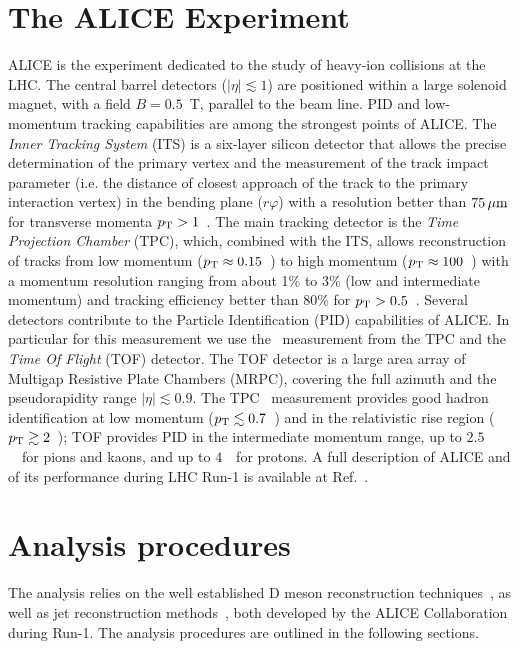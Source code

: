 \documentclass[a4paper]{jpconf}
\begin{document}
\section{The ALICE Experiment}
ALICE is the experiment dedicated to the study of heavy-ion collisions at the LHC.
The central barrel detectors ($\lvert \eta\rvert \lesssim 1$) are positioned within a large solenoid magnet, with a
field $B = 0.5$~T, parallel to the beam line.
PID and low-momentum tracking capabilities are among the strongest points of ALICE.
The \emph{Inner Tracking System} (ITS) is a six-layer silicon detector that allows the precise determination of the primary vertex 
and the measurement of the track impact parameter (i.e. the distance of
closest approach of the track to the primary interaction vertex) in the bending plane ($r\varphi$) with a resolution
better than $75\, \rm \mu m$ for transverse momenta $p_{\rm T} > 1$~\GeVc.
The main tracking detector is the \emph{Time Projection Chamber} (TPC), which, combined with the ITS, allows reconstruction of tracks 
from low momentum ($p_{\rm T}\approx0.15$~\GeVc) to high momentum
($p_{\rm T}\approx100$~\GeVc) with a momentum resolution ranging from about 1\% to 3\% (low and intermediate momentum) and tracking
efficiency better than 80\% for $p_{\rm T}>0.5$~\GeVc.
Several detectors contribute to the Particle Identification (PID) capabilities of ALICE. 
In particular for this measurement we use the \dedx\ measurement from the TPC and
the \emph{Time Of Flight} (TOF) detector. The TOF detector is a large area array of Multigap Resistive Plate
Chambers (MRPC), covering the full azimuth and
the pseudorapidity range $\lvert \eta\rvert \lesssim 0.9$.
The TPC \dedx\ measurement provides good hadron identification at low momentum ($p_{\rm T}\lesssim0.7$~\GeVc) and 
in the relativistic rise region ($p_{\rm T}\gtrsim2$~\GeVc);
TOF provides PID in the intermediate momentum range,
up to $2.5$~\GeVc\ for pions and kaons, and up to $4$~\GeVc\ for protons.
A full description of ALICE and of its performance during LHC Run-1 is available at Ref.~\cite{ALICE:2014b}.

\section{Analysis procedures}
The analysis relies on the well established D meson reconstruction techniques~\cite{ALICE:2012d, ALICE:2016b}, as well as
jet reconstruction methods~\cite{ALICE:2013c, ALICE:2014a, ALICE:2015a, ALICE:2015e}, both developed by the ALICE Collaboration during Run-1. The analysis procedures are outlined in the following sections.
\end{document}
